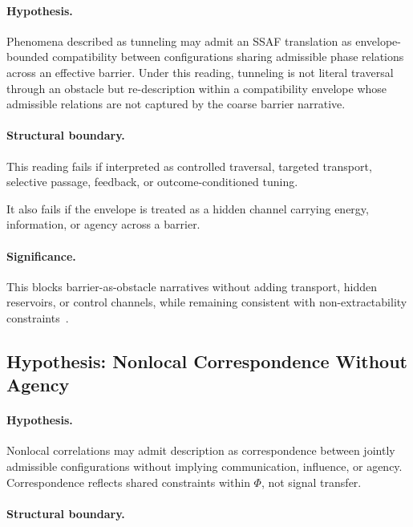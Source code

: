 \documentclass[aps,prx,onecolumn,11pt]{revtex4-2}
\theoremstyle{plain}
\theoremstyle{definition}
\theoremstyle{remark}
\begin{document}
\paragraph{Hypothesis.}

Phenomena described as tunneling may admit an SSAF translation as
envelope-bounded compatibility between configurations sharing
admissible phase relations across an effective barrier. Under this
reading, tunneling is not literal traversal through an obstacle but
re-description within a compatibility envelope whose admissible
relations are not captured by the coarse barrier narrative.

\paragraph{Structural boundary.}

This reading fails if interpreted as controlled traversal, targeted
transport, selective passage, feedback, or outcome-conditioned tuning.

It also fails if the envelope is treated as a hidden channel carrying
energy, information, or agency across a barrier.

\paragraph{Significance.}

This blocks barrier-as-obstacle narratives without adding transport,
hidden reservoirs, or control channels, while remaining consistent with
non-extractability constraints~\cite{Landauer1961,Pusz1978}.

\subsection{Hypothesis: Nonlocal Correspondence Without Agency}
\label{subsec:hyp_nonlocal_correspondence}

\paragraph{Hypothesis.}

Nonlocal correlations may admit description as correspondence between
jointly admissible configurations without implying communication,
influence, or agency. Correspondence reflects shared constraints within
\(\Phi\), not signal transfer.

\paragraph{Structural boundary.}
\end{document}

